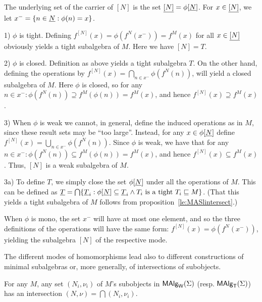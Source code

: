\documentclass[10pt]{article}
\begin{document}
\begin{Proof}
The underlying set of the carrier of $[N]$ is the set
$\underline {[N]}=\phi[\underline {N}]$. For $x\in\underline {[N]}$, we let
$x^-=\{n\in\underline {N}: \phi(n)=x\}$.

1) $\phi$ is tight. Defining $f^{[N]}(x)=\phi(f^N(x^-))=f^M(x)$ for
all $x\in\underline {[N]}$ obviously yields a tight subalgebra of $M$. Here
we have $[N]=T$. 

2) $\phi$ is closed. Definition as above yields a tight subalgebra
$T$.  On the other hand, defining the operations by
$f^{[N]}(x)=\bigcap_{n\in x^-}\phi(f^N(n))$, will yield a closed
subalgebra of $M$. Here $\phi$ is closed, so for any $n\in x^-:
\phi(f^N(n))\supseteq f^M(\phi(n))=f^M(x)$, and hence
$f^{[N]}(x)\supseteq f^M(x)$.  

3) When $\phi$ is weak we cannot, in general, define the induced
operations as in $M$, since these result sets may be ``too
large''. Instead, for any $x\in\phi[\underline {N}]$ define
$f^{[N]}(x)=\bigcup_{n\in x^-}\phi(f^N(n))$.  Since $\phi$ is weak, we
have that for any $n\in x^-:\phi(f^N(n))\subseteq
f^M(\phi(n))=f^M(x)$, and hence $f^{[N]}(x)\subseteq f^M(x)$. Thus,
$[N]$ is a weak subalgebra of $M$. 

3a) To define $T$, we simply close the set $\phi[\underline {N}]$ under all
the operations of $M$. This can be defined as $\underline {T}=\bigcap\{\underline {T}_i:\phi[\underline {N}]\subseteq\underline {T}_i \land T_i\
{\rm is\ a\ tight\ }T_i\mathrel{\sqsubseteq} M\}$. (That this yields a tight
subalgebra of $M$ follows from proposition~\ref{le:MASlintersect}.)
\end{Proof}

\noindent
When $\phi$ is mono, the set $x^-$ will have at most one element, and
so the three definitions of the operations will have the same form:
$f^{[N]}(x)=\phi(f^N(x^-))$, yielding the subalgebra $[N]$ of the
respective mode.


The different modes of homomorphisms lead also to different
constructions of minimal subalgebras or, more generally, of
intersections of subobjects.

\begin{Prop}
\label{le:MASlintersect}
For any $M$, any set $(N_i,\nu_i)$ of $M$'s subobjects in $\mbox{\rm\sf MAlg}_{\sf W}(\Sigma)$
(resp. $\mbox{\rm\sf MAlg}_{\sf T}(\Sigma)$) has an intersection $(N,\nu)=\bigcap (N_i,\nu_i)$.
\end{Prop}
\end{document}
